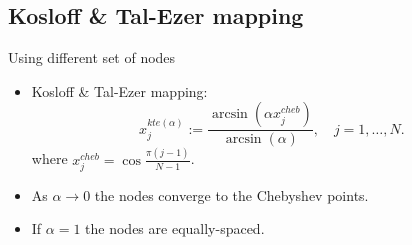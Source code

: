 \documentclass{beamer}
\begin{document}
\subsection{Kosloff \& Tal-Ezer mapping}
\begin{frame}{Using different set of nodes}
  \begin{itemize}
    \item Kosloff \& Tal-Ezer mapping:
      \begin{equation*}
        x_j^{kte(\alpha)} := \frac{\arcsin(\alpha x_j^{cheb})}{\arcsin(\alpha)},
	\quad j = 1,\ldots,N.
      \end{equation*}
      where $x_j^{cheb} = \cos{\frac{\pi(j-1)}{N-1}}$.

    \item As $\alpha \rightarrow 0$ the nodes converge to the Chebyshev points.

    \item If $\alpha = 1$ the nodes are equally-spaced.
  \end{itemize}
\end{frame}
\end{document}

